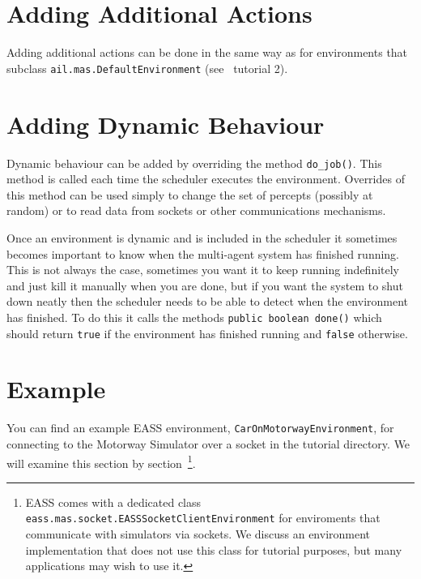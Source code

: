 \section{Adding Additional Actions}
Adding additional actions can be done in the same way as for environments that subclass \texttt{ail.mas.DefaultEnvironment} (see \ail\ tutorial 2).

\section{Adding Dynamic Behaviour}

Dynamic behaviour can be added by overriding the method \texttt{do\_job()}.  This method is called each time the scheduler executes the environment.  Overrides of this method can be used simply to change the set of percepts (possibly at random) or to read data from sockets or other communications mechanisms.

Once an environment is dynamic and is included in the scheduler it sometimes becomes important to know when the multi-agent system has finished running.  This is not always the case, sometimes you want it to keep running indefinitely and just kill it manually when you are done, but if you want the system to shut down neatly then the scheduler needs to be able to detect when the environment has finished.  To do this it calls the methods \texttt{public boolean done()} which should return \texttt{true} if the environment has finished running and \texttt{false} otherwise.

\section{Example}
You can find an example EASS environment, \texttt{CarOnMotorwayEnvironment}, for connecting to the Motorway Simulator over a socket in the tutorial directory.  We will examine this section by section~\footnote{EASS comes with a dedicated class \texttt{eass.mas.socket.EASSSocketClientEnvironment} for enviroments that communicate with simulators via sockets.  We discuss an environment implementation that does not use this class for tutorial purposes, but many applications may wish to use it.}.

